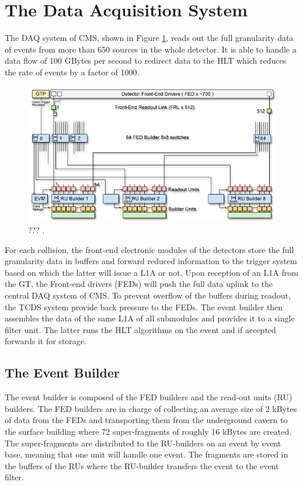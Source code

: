   \section{The Data Acquisition System}

    The DAQ system of CMS, shown in Figure \ref{fig:I-3-daq}, reads out the full granularity data of events from more than 650 sources in the whole detector. It is able to handle a data flow of 100 GBytes per second to redirect data to the HLT which reduces the rate of events by a factor of 1000. \\

      \begin{figure}[h!]
        \centering
        \includegraphics[width=\textwidth]{img/I-3-cms/daq.jpg}
        \caption{??? \cite{1748-0221-3-08-S08004}.}
        \label{fig:I-3-daq}
      \end{figure}

    For each collision, the front-end electronic modules of the detectors store the full granularity data in buffers and forward reduced information to the trigger system based on which the latter will issue a L1A or not. Upon reception of an L1A from the GT, the Front-end drivers (FEDs) will push the full data uplink to the central DAQ system of CMS. To prevent overflow of the buffers during readout, the TCDS system provide back pressure to the FEDs. The event builder then assembles the data of the same L1A of all submodules and provides it to a single filter unit. The latter runs the HLT algorithms on the event and if accepted forwards it for storage.

    \subsection{The Event Builder}

      The event builder is composed of the FED builders and the read-out units (RU) builders. The FED builders are in charge of collecting an average size of 2 kBytes of data from the FEDs and transporting them from the underground cavern to the surface building where 72 super-fragments of roughly 16 kBytes are created. The super-fragments are distributed to the RU-builders on an event by event base, meaning that one unit will handle one event. The fragments are stored in the buffers of the RUs where the RU-builder transfers the event to the event filter.

